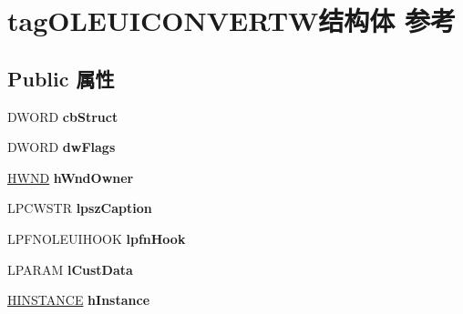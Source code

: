 \hypertarget{structtag_o_l_e_u_i_c_o_n_v_e_r_t_w}{}\section{tag\+O\+L\+E\+U\+I\+C\+O\+N\+V\+E\+R\+T\+W结构体 参考}
\label{structtag_o_l_e_u_i_c_o_n_v_e_r_t_w}
\subsection*{Public 属性}
\begin{DoxyCompactItemize}
\item 
\mbox{\label{structtag_o_l_e_u_i_c_o_n_v_e_r_t_w_a614c2803531ec7fda21cb0c665fc2b57}} 
D\+W\+O\+RD {\bfseries cb\+Struct}
\item 
\mbox{\label{structtag_o_l_e_u_i_c_o_n_v_e_r_t_w_a4abfdddc671736a5f39cd51f5d6bae62}} 
D\+W\+O\+RD {\bfseries dw\+Flags}
\item 
\mbox{\label{structtag_o_l_e_u_i_c_o_n_v_e_r_t_w_a71fa63bf491c162af104ef3aa5c4536d}} 
\hyperlink{interfacevoid}{H\+W\+ND} {\bfseries h\+Wnd\+Owner}
\item 
\mbox{\label{structtag_o_l_e_u_i_c_o_n_v_e_r_t_w_abb0e262241d8f0f6b8d40fb193b08ae9}} 
L\+P\+C\+W\+S\+TR {\bfseries lpsz\+Caption}
\item 
\mbox{\label{structtag_o_l_e_u_i_c_o_n_v_e_r_t_w_a6bedd0099e5084071a148535808bc8bb}} 
L\+P\+F\+N\+O\+L\+E\+U\+I\+H\+O\+OK {\bfseries lpfn\+Hook}
\item 
\mbox{\label{structtag_o_l_e_u_i_c_o_n_v_e_r_t_w_afe424a159f5ce9722f138bb1b69c3824}} 
L\+P\+A\+R\+AM {\bfseries l\+Cust\+Data}
\item 
\mbox{\label{structtag_o_l_e_u_i_c_o_n_v_e_r_t_w_a8210f39a82a150196dab56c82db991b1}} 
\hyperlink{interfacevoid}{H\+I\+N\+S\+T\+A\+N\+CE} {\bfseries h\+Instance}
\item 
\mbox{\label{structtag_o_l_e_u_i_c_o_n_v_e_r_t_w_ac8eb37468804762d6173cd222f231e7a}} 

\end{DoxyCompactItemize}
